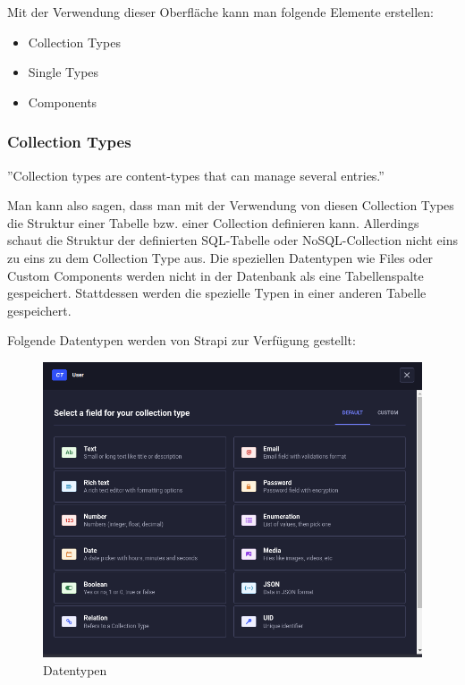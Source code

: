Mit der Verwendung dieser Oberfläche kann man folgende Elemente erstellen:
\begin{itemize}
  \item Collection Types
  \item Single Types
  \item Components
\end{itemize}

\subsubsection{Collection Types}

''Collection types are content-types that can manage several entries.''
\cite{collection-types}

Man kann also sagen, dass man mit der Verwendung von diesen Collection Types die Struktur einer Tabelle bzw. einer Collection definieren kann.
Allerdings schaut die Struktur der definierten SQL-Tabelle oder NoSQL-Collection nicht eins zu eins zu dem Collection Type aus.
Die speziellen Datentypen wie Files oder Custom Components werden nicht in der Datenbank als eine Tabellenspalte gespeichert.
Stattdessen werden die spezielle Typen in einer anderen Tabelle gespeichert.

Folgende Datentypen  werden von Strapi zur Verfügung gestellt:

\begin{figure}[H]
  \centering
  \includegraphics[width=\textwidth]{./pics/datatypes}
  \caption{Datentypen}
  \label{datatypes}
\end{figure}

